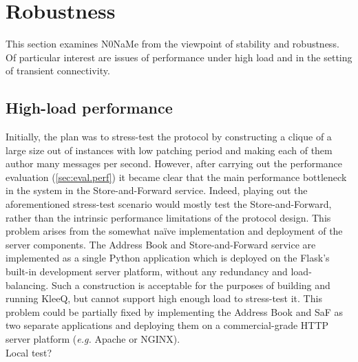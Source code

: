 \documentclass[a4paper, 12pt]{report}
\newcommand{\funkytt}{\fontfamily{AnonymousPro}\selectfont}
\begin{document}
\section{Robustness}
\label{sec:eval.robust}
This section examines {\funkytt N0NaMe} from the viewpoint of stability and robustness. Of particular interest are issues of performance under high load and in the setting of transient connectivity.

\subsection{High-load performance}
Initially, the plan was to stress-test the protocol by constructing a clique of a large size out of instances with low patching period and making each of them author many messages per second. However, after carrying out the performance evaluation (\cref{sec:eval.perf}) it became clear that the main performance bottleneck in the system in the Store-and-Forward service. Indeed, playing out the aforementioned stress-test scenario would mostly test the Store-and-Forward, rather than the intrinsic performance limitations of the protocol design. This problem arises from the somewhat na{\"i}ve implementation and deployment of the server components. The Address Book and Store-and-Forward service are implemented as a single Python application which is deployed on the Flask's built-in development server platform, without any redundancy and load-balancing. Such a construction is acceptable for the purposes of building and running KleeQ, but cannot support high enough load to stress-test it. This problem could be partially fixed by implementing the Address Book and SaF as two separate applications and deploying them on a commercial-grade HTTP server platform (\textit{e.g.} Apache or NGINX). \\

{\color{red} Local test?}

\end{document}
